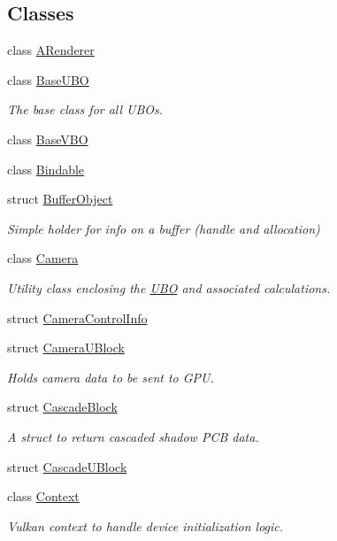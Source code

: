 \subsection*{Classes}
\begin{DoxyCompactItemize}
\item 
class \hyperlink{classblaze_1_1ARenderer}{A\+Renderer}
\item 
class \hyperlink{classblaze_1_1BaseUBO}{Base\+U\+BO}
\begin{DoxyCompactList}\small\item\em The base class for all U\+B\+Os. \end{DoxyCompactList}\item 
class \hyperlink{classblaze_1_1BaseVBO}{Base\+V\+BO}
\item 
class \hyperlink{classblaze_1_1Bindable}{Bindable}
\item 
struct \hyperlink{structblaze_1_1BufferObject}{Buffer\+Object}
\begin{DoxyCompactList}\small\item\em Simple holder for info on a buffer (handle and allocation) \end{DoxyCompactList}\item 
class \hyperlink{classblaze_1_1Camera}{Camera}
\begin{DoxyCompactList}\small\item\em Utility class enclosing the \hyperlink{classblaze_1_1UBO}{U\+BO} and associated calculations. \end{DoxyCompactList}\item 
struct \hyperlink{structblaze_1_1CameraControlInfo}{Camera\+Control\+Info}
\item 
struct \hyperlink{structblaze_1_1CameraUBlock}{Camera\+U\+Block}
\begin{DoxyCompactList}\small\item\em Holds camera data to be sent to G\+PU. \end{DoxyCompactList}\item 
struct \hyperlink{structblaze_1_1CascadeBlock}{Cascade\+Block}
\begin{DoxyCompactList}\small\item\em A struct to return cascaded shadow P\+CB data. \end{DoxyCompactList}\item 
struct \hyperlink{structblaze_1_1CascadeUBlock}{Cascade\+U\+Block}
\item 
class \hyperlink{classblaze_1_1Context}{Context}
\begin{DoxyCompactList}\small\item\em Vulkan context to handle device initialization logic. \end{DoxyCompactList}\item 

\end{DoxyCompactItemize}
